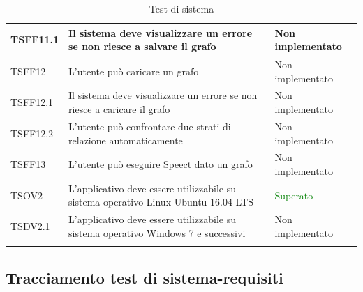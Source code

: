 \documentclass[openany,12pt,a4paper]{report}
\begin{document}
\begin{longtable}[c]{| p{2cm} |p{8cm} | p{2.5cm} |}
	
	\newline TSFF11.1&
	\newline Il sistema deve visualizzare un errore se non riesce a salvare il grafo&
	\newline Non implementato 
	\\[1em]
	\hline
	
	\newline TSFF12&
	\newline L'utente può caricare un grafo&
	\newline Non implementato
	\\[1em]
	\hline
	
	\newline TSFF12.1&
	\newline Il sistema deve visualizzare un errore se non riesce a caricare il grafo&
	\newline Non implementato
	\\[1em]
	\hline
	
	\newline TSFF12.2&
	\newline L'utente può confrontare due strati di relazione automaticamente&
	\newline Non implementato
	\\[1em]
	\hline
	
	
	\newline TSFF13&
	\newline L'utente può eseguire Speect dato un grafo&
	\newline Non implementato
	\\[1em]
	\hline
	
	\newline TSOV2&
	\newline 
	L'applicativo deve essere utilizzabile su sistema operativo Linux Ubuntu 16.04 LTS&
	\newline \textcolor{green}{Superato}
	\\[1em]
	\hline
	\newline TSDV2.1&
	\newline 
	L'applicativo deve essere utilizzabile su sistema operativo Windows 7 e successivi&
	\newline Non implementato
	\\[1em]
	\hline
\caption{Test di sistema}
\end{longtable}

\subsection{Tracciamento test di sistema-requisiti}
\end{document}

